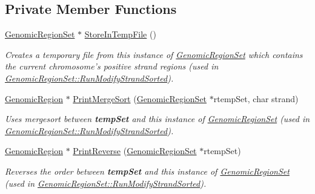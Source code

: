 \subsection*{Private Member Functions}
\begin{CompactItemize}
\item 
\hypertarget{classGenomicRegionSet_cd823956ec9f510ee3d52b08eec1b2f6}{
\hyperlink{classGenomicRegionSet}{GenomicRegionSet} $\ast$ \hyperlink{classGenomicRegionSet_cd823956ec9f510ee3d52b08eec1b2f6}{StoreInTempFile} ()}
\label{classGenomicRegionSet_cd823956ec9f510ee3d52b08eec1b2f6}

\begin{CompactList}\small\item\em Creates a temporary file from this instance of \hyperlink{classGenomicRegionSet}{GenomicRegionSet} which contains the current chromosome's positive strand regions (used in \hyperlink{classGenomicRegionSet_7c0a328896b88a0c837f60e89fd85584}{GenomicRegionSet::RunModifyStrandSorted}). \item\end{CompactList}\item 
\hypertarget{classGenomicRegionSet_b118bb8a6b63ae47a37ef89bff25ab72}{
\hyperlink{classGenomicRegion}{GenomicRegion} $\ast$ \hyperlink{classGenomicRegionSet_b118bb8a6b63ae47a37ef89bff25ab72}{PrintMergeSort} (\hyperlink{classGenomicRegionSet}{GenomicRegionSet} $\ast$rtempSet, char strand)}
\label{classGenomicRegionSet_b118bb8a6b63ae47a37ef89bff25ab72}

\begin{CompactList}\small\item\em Uses mergesort between {\bf tempSet} and this instance of \hyperlink{classGenomicRegionSet}{GenomicRegionSet} (used in \hyperlink{classGenomicRegionSet_7c0a328896b88a0c837f60e89fd85584}{GenomicRegionSet::RunModifyStrandSorted}). \item\end{CompactList}\item 
\hypertarget{classGenomicRegionSet_e601878a7754a7e5bc8b4ed340d012f4}{
\hyperlink{classGenomicRegion}{GenomicRegion} $\ast$ \hyperlink{classGenomicRegionSet_e601878a7754a7e5bc8b4ed340d012f4}{PrintReverse} (\hyperlink{classGenomicRegionSet}{GenomicRegionSet} $\ast$rtempSet)}
\label{classGenomicRegionSet_e601878a7754a7e5bc8b4ed340d012f4}

\begin{CompactList}\small\item\em Reverses the order between {\bf tempSet} and this instance of \hyperlink{classGenomicRegionSet}{GenomicRegionSet} (used in \hyperlink{classGenomicRegionSet_7c0a328896b88a0c837f60e89fd85584}{GenomicRegionSet::RunModifyStrandSorted}). \item\end{CompactList}\end{CompactItemize}


